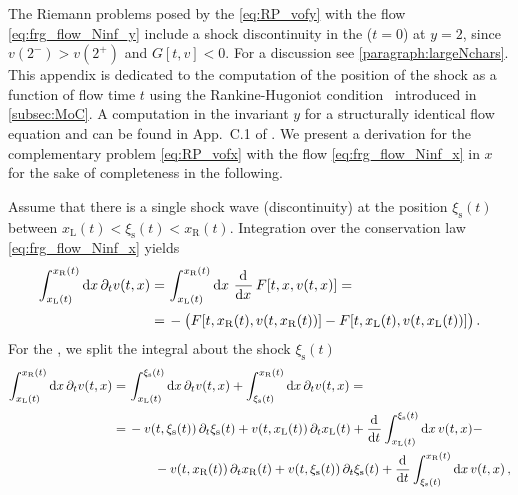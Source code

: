 The Riemann problems posed by the \ic{} \eqref{eq:RP_vofy} with the flow \cref{eq:frg_flow_Ninf_y} include a shock discontinuity in the \uv{} ($t = 0$) at $y = 2$, since $v ( 2^{-} ) > v ( 2^{+} )$ and $G [ t, v ] < 0$. For a discussion see \cref{paragraph:largeNchars}.
This appendix is dedicated to the computation of the position of the shock as a function of flow time $t$ using the Rankine-Hugoniot condition~\cite{Rankine:1870,Hugoniot:1887} introduced in \cref{subsec:MoC}.
A computation in the invariant $y$ for a structurally identical flow equation and \ic{} can be found in App.~C.1 of .
We present a derivation for the complementary problem \dash{} \ic{}  \eqref{eq:RP_vofx} with the flow \cref{eq:frg_flow_Ninf_x} \dash{} in $x$ for the sake of completeness in the following.\bigskip

Assume that there is a single shock wave (discontinuity) at the position $\xi_\mathrm{s} ( t )$ between ${ x_\mathrm{L} ( t ) < \xi_\mathrm{s} ( t ) < x_\mathrm{R} ( t ) }$. Integration over the conservation law \eqref{eq:frg_flow_Ninf_x} yields
	\begin{align}
	 \int_{x_\mathrm{L} ( t )}^{x_\mathrm{R} ( t )} \dif x \, \partial_t v ( t, x ) =& \,  \int_{x_\mathrm{L} ( t )}^{x_\mathrm{R} ( t )} \dif x \, \dod{}{x} F [ t, x , v ( t, x ) ] =\nonumber\\*[.2em] %
	=&\,- \big( F [ t, x_\mathrm{R} ( t ), v ( t, x_\mathrm{R} ( t ) ) ] - F [ t, x_\mathrm{L} ( t ), v ( t, x_\mathrm{L} ( t ) ) ] \big)		\, . 
	\end{align}
For the \lhs{}, we split the integral about the shock $\xi_\mathrm{s} ( t )$
	\begin{align}
		\int_{x_\mathrm{L} ( t )}^{x_\mathrm{R} ( t )} \dif x \, \partial_t v ( t, x )\nonumber
		= \, & \int_{x_\mathrm{L} ( t )}^{\xi_\mathrm{s} ( t )} \dif x \, \partial_t  v ( t, x ) + \int_{\xi_\mathrm{s} ( t )}^{x_\mathrm{R} ( t )} \dif x \, \partial_t  v ( t, x ) =		\nonumber\\*[.2em] %
		= \, & - v ( t, \xi_\mathrm{s} ( t) ) \, \partial_t \xi_\mathrm{s} ( t ) + v ( t, x_\mathrm{L} ( t ) ) \, \partial_t x_\mathrm{L} ( t )
		 + \dod{}{t} \int_{x_\mathrm{L} ( t )}^{\xi_\mathrm{s} ( t )} \dif x \, v ( t, x ) - \notag\\* %
		&\qquad- v ( t, x_\mathrm{R} ( t ) ) \, \partial_t x_\mathrm{R} ( t ) + v ( t, \xi_\mathrm{s} ( t) ) \, \partial_t \xi_\mathrm{s} ( t )
		+ \dod{}{t} \int_{\xi_\mathrm{s} ( t )}^{x_\mathrm{R} ( t )} \dif x \, v ( t, x )		\, ,
	\end{align}
